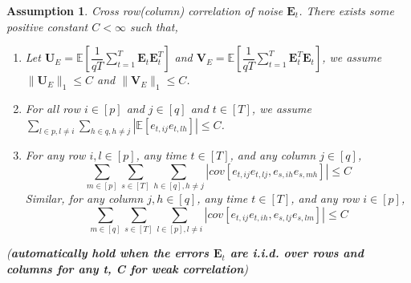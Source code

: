\documentclass{article}[12pt]
\newtheorem{assumption}{Assumption}
\begin{document}
\begin{assumption}\label{assumption 4 1.7.1}
    Cross row(column) correlation of noise $\mathbf{E}_t$. \normalfont There exists some positive constant $C<\infty$ such that,
    \begin{enumerate}
        \item Let $\mathbf{U}_E = \mathbb{E}\left[\dfrac{1}{qT}\sum_{t=1}^T\mathbf{E}_t\mathbf{E}_t^T\right]$ and $\mathbf{V}_E = \mathbb{E}\left[\dfrac{1}{qT}\sum_{t=1}^T\mathbf{E}_t^T\mathbf{E}_t\right]$, we assume $\lVert\mathbf{U}_E\rVert_1\leq C$ and $\lVert\mathbf{V}_E\rVert_1\leq C$.
        \item For all row $i \in \left[p\right]$ and $j \in \left[q\right]$ and $t \in \left[T\right]$, we assume $\sum_{l \in p, l \neq i}\sum_{h \in q, h \neq j}|\mathbb{E}\left[e_{t,ij}e_{t,lh}\right]|\leq C$.
        \item For any row $i,l \in \left[p\right]$, any time $t \in \left[T\right]$, and any column $j \in \left[q\right]$,
        $$\sum\limits_{m \in \left[p\right]}\sum\limits_{s \in \left[T\right]}\sum\limits_{h \in \left[q\right], h \neq j}|cov\left[e_{t,ij}e_{t,lj},e_{s,ih}e_{s,mh}\right]| \leq C$$
        \noindent Similar, for any column $j,h \in \left[q\right]$, any time $t \in \left[T\right]$, and any row $i \in \left[p\right]$,
        $$\sum\limits_{m \in \left[q\right]}\sum\limits_{s \in \left[T\right]}\sum\limits_{l \in \left[p\right], l \neq i}|cov\left[e_{t,ij}e_{t,ih},e_{s,lj}e_{s,lm}\right]| \leq C$$
    \end{enumerate}
    
    \noindent (\textbf{\textit{automatically hold when the errors $\mathbf{E}_t$ are i.i.d. over rows and columns for any t, C for weak correlation}})
\end{assumption}
\end{document}
